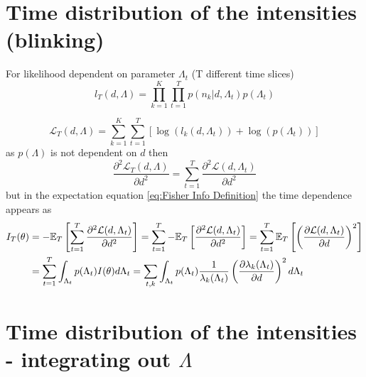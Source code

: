 \section{Time distribution of the intensities (blinking)\label{sub:Appendix: Time-distribution - Cheating}}

For likelihood dependent on parameter $\Lambda_t$ (T different time slices)
%
\begin{equation}
	l_T(d,\Lambda)=\prod_{k=1}^K\prod_{t=1}^Tp(n_k|d,\Lambda_t)p(\Lambda_t)
\end{equation}

\begin{equation}
	\mathcal{L}_T(d,\Lambda)=\sum_{k=1}^K\sum_{t=1}^T\left[\log\left(l_k(d,\Lambda_t)\right)+\log\left(p(\Lambda_t)\right)\right]
\end{equation}
%
as $p(\Lambda)$ is not dependent on $d$ then
%
\begin{equation}
	\frac{\partial^2\mathcal{L}_T(d,\Lambda)}{\partial d^2}=\sum_{t=1}^T\frac{\partial^2\mathcal{L}(d,\Lambda_t)}{\partial d^2}
\end{equation}
%
but in the expectation equation \autoref{eq:Fisher Info Definition} the time dependence appears as
%
\begin{alignat*}{1}
	I_T(\theta) & =-\mathbb{E}_T\left[\sum_{t=1}^T\frac{\partial^2\mathcal{L}(d,\Lambda_t)}{\partial d^2}\right]=\sum_{t=1}^T-\mathbb{E}_T\left[\frac{\partial^2\mathcal{L}(d,\Lambda_t)}{\partial d^2}\right]=\sum_{t=1}^T\mathbb{E}_T\left[\left(\frac{\partial\mathcal{L}(d,\Lambda_t)}{\partial d}\right)^2\right]\\
	 & =\sum_{t=1}^T\int_{\Lambda_t}p(\Lambda_t)I(\theta)d\Lambda_t=\sum_{t,k}\int_{\Lambda_t}p(\Lambda_t)\frac{1}{\lambda_k(\Lambda_t)}\left(\frac{\partial\lambda_k(\Lambda_t)}{\partial d}\right)^2d\Lambda_t
\end{alignat*}


\section{Time distribution of the intensities - integrating out $\Lambda$\label{sub:Appendix Time-distribution-Integrating out}}

